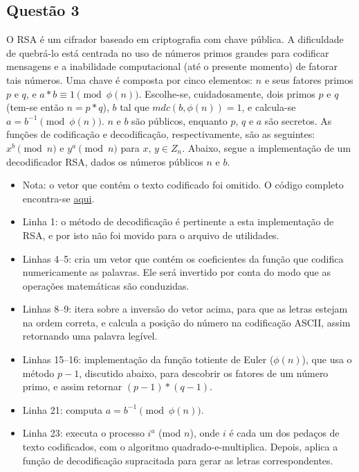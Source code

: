\documentclass{../sftex/sftex}
\begin{document}
\subsection*{Questão 3}

O RSA é um cifrador baseado em criptografia com chave pública. A dificuldade
de quebrá-lo está centrada no uso de números primos grandes para codificar
mensagens e a inabilidade computacional (até o presente momento) de fatorar
tais números. Uma chave é composta por cinco elementos: $n$ e seus fatores
primos $p$ e $q$, e $a*b \equiv 1 \pmod{\phi(n)}$. Escolhe-se,
cuidadosamente, dois primos $p$ e $q$ (tem-se então $n = p*q$), $b$ tal que
$mdc(b, \phi(n)) = 1$, e calcula-se $a = b^{-1} \pmod{\phi(n)}$.
$n$ e $b$ são públicos, enquanto $p$, $q$ e $a$ são secretos. As funções de
codificação e decodificação, respectivamente, são as seguintes:
$x^{b} \pmod{n}$ e $y^{a} \pmod{n}$ para $x$, $y \in Z_{n}$. Abaixo, segue a
implementação de um decodificador RSA, dados os números públicos $n$ e $b$.

\begin{itemize}

    

    \item Nota: o vetor que contém o texto codificado foi omitido. O código
        completo encontra-se
        \href{https://raw.githubusercontent.com/zambonin/UFSC-INE5451/master/modern/rsa.py}{aqui}.

    \item Linha 1: o método de decodificação é pertinente a esta implementação
        de RSA, e por isto não foi movido para o arquivo de utilidades.

    \item Linhas 4--5: cria um vetor que contém os coeficientes da função que
        codifica numericamente as palavras. Ele será invertido por conta do
        modo que as operações matemáticas são conduzidas.

    \item Linhas 8--9: itera sobre a inversão do vetor acima, para que as
        letras estejam na ordem correta, e calcula a posição do número na
        codificação ASCII, assim retornando uma palavra legível.

    \item Linhas 15--16: implementação da função totiente de Euler
        ($\phi(n)$), que usa o método $p - 1$, discutido abaixo, para
        descobrir os fatores de um número primo, e assim retornar
        $(p-1)*(q-1)$.

    \item Linha 21: computa $a = b^{-1} \pmod{\phi(n)}$.

    \item Linha 23: executa o processo $i^{a}$ (mod $n$), onde $i$ é cada um
        dos pedaços de texto codificados, com o algoritmo
        quadrado-e-multiplica. Depois, aplica a função de decodificação
        supracitada para gerar as letras correspondentes.

\end{itemize}
\end{document}
